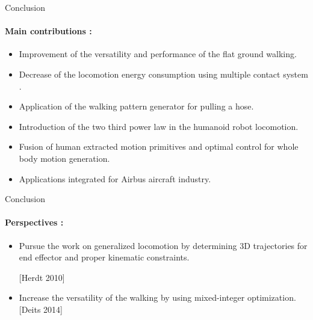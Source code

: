 
\begin{frame}{Conclusion}
\framesubtitle{Main contributions :}
\begin{itemize}
  \item Improvement of the versatility and performance of the flat ground walking.
  \item Decrease of the locomotion energy consumption using multiple contact system .
  \item Application of the walking pattern generator for pulling a hose.
  \item Introduction of the two third power law in the humanoid robot locomotion.
  \item Fusion of human extracted motion primitives and optimal control for whole body motion generation.
  \item Applications integrated for Airbus aircraft industry.
\end{itemize}

\end{frame}

\begin{frame}{Conclusion}
\framesubtitle{Perspectives :}
\begin{itemize}
  \item Pursue the  work on generalized locomotion by determining 3D trajectories for end effector and proper kinematic constraints.
  
  [Herdt 2010]
  \item Increase the versatility of the walking by using mixed-integer optimization. [Deits 2014]
\end{itemize}
\end{frame}
